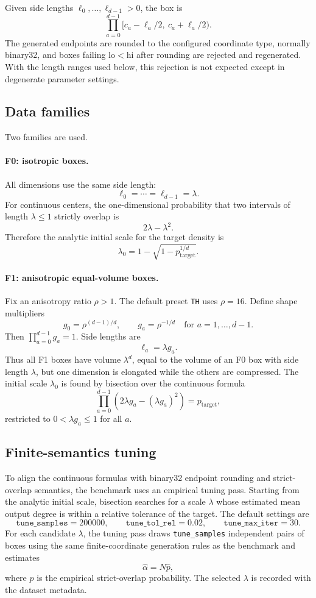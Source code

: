 \documentclass[11pt]{article}
\theoremstyle{definition}
\theoremstyle{plain}
\theoremstyle{remark}
\newcommand{\lo}{\mathrm{lo}}
\newcommand{\hi}{\mathrm{hi}}
\begin{document}
Given side lengths $\ell_0,\ldots,\ell_{d-1}>0$, the box is
\[
  \prod_{a=0}^{d-1}[c_a-\ell_a/2,\ c_a+\ell_a/2).
\]
The generated endpoints are rounded to the configured coordinate type, normally binary32,
and boxes failing $\lo<\hi$ after rounding are rejected and regenerated.  With the length
ranges used below, this rejection is not expected except in degenerate parameter settings.

\subsection{Data families}

Two families are used.

\paragraph{F0: isotropic boxes.}
All dimensions use the same side length:
\[
  \ell_0=\cdots=\ell_{d-1}=\lambda.
\]
For continuous centers, the one-dimensional probability that two intervals of length
$\lambda\le 1$ strictly overlap is
\[
  2\lambda-\lambda^2.
\]
Therefore the analytic initial scale for the target density is
\[
  \lambda_0 = 1-\sqrt{1-p_{\mathrm{target}}^{1/d}}.
\]

\paragraph{F1: anisotropic equal-volume boxes.}
Fix an anisotropy ratio $\rho>1$.  The default preset \texttt{TH} uses $\rho=16$.  Define
shape multipliers
\[
  g_0=\rho^{(d-1)/d},
  \qquad
  g_a=\rho^{-1/d}\quad\text{for }a=1,\ldots,d-1.
\]
Then $\prod_{a=0}^{d-1}g_a=1$.  Side lengths are
\[
  \ell_a=\lambda g_a.
\]
Thus all F1 boxes have volume $\lambda^d$, equal to the volume of an F0 box with side length
$\lambda$, but one dimension is elongated while the others are compressed.  The initial
scale $\lambda_0$ is found by bisection over the continuous formula
\[
  \prod_{a=0}^{d-1}(2\lambda g_a-(\lambda g_a)^2)
  = p_{\mathrm{target}},
\]
restricted to $0<\lambda g_a\le 1$ for all $a$.

\subsection{Finite-semantics tuning}

To align the continuous formulas with binary32 endpoint rounding and strict-overlap
semantics, the benchmark uses an empirical tuning pass.  Starting from the analytic initial
scale, bisection searches for a scale $\lambda$ whose estimated mean output degree is within
a relative tolerance of the target.  The default settings are
\[
  \texttt{tune\_samples}=200000,
  \qquad
  \texttt{tune\_tol\_rel}=0.02,
  \qquad
  \texttt{tune\_max\_iter}=30.
\]
For each candidate $\lambda$, the tuning pass draws \texttt{tune\_samples} independent pairs
of boxes using the same finite-coordinate generation rules as the benchmark and estimates
\[
  \widehat\alpha=N\widehat p,
\]
where $\widehat p$ is the empirical strict-overlap probability.  The selected $\lambda$ is
recorded with the dataset metadata.
\end{document}
